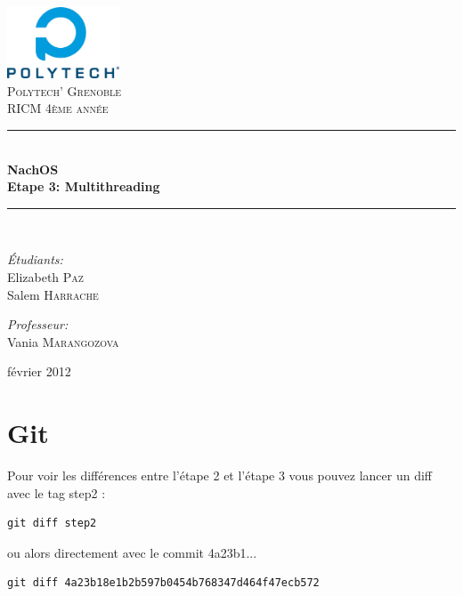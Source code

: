 \documentclass[a4paper,10pt]{article}
\newcommand{\HRule}{\rule{\linewidth}{0.6mm}}
\begin{document}
\begin{titlepage}

\begin{center}


\includegraphics[width=0.25\textwidth]{../images/logo}\\[1cm]

\textsc{\LARGE Polytech' Grenoble}\\[1.5cm]

\textsc{\Large RICM 4\`eme ann\'ee}\\[1.2cm]


\HRule \\[0.4cm]
{ \huge \bfseries NachOS\\[0.6cm]
Etape 3: Multithreading}
\\[0.4cm]

\HRule \\[2cm]

\begin{minipage}{0.4\textwidth}
\begin{flushleft} \large
\emph{\'Etudiants:}\\
Elizabeth \textsc{Paz} \\
Salem \textsc{Harrache}
\end{flushleft}
\end{minipage}
\begin{minipage}{0.4\textwidth}
\begin{flushright} \large
\emph{Professeur:} \\
Vania \textsc{Marangozova}
\end{flushright}
\end{minipage}

\vfill

{\large  février 2012}

\end{center}

\end{titlepage}

\section{Git}

Pour voir les différences entre l'étape 2 et l'étape 3 vous pouvez lancer un
diff avec le tag step2 :
\begin{lstlisting}
git diff step2
\end{lstlisting}
ou alors directement avec le commit 4a23b1...
\begin{lstlisting}
git diff 4a23b18e1b2b597b0454b768347d464f47ecb572
\end{lstlisting}
\end{document}
